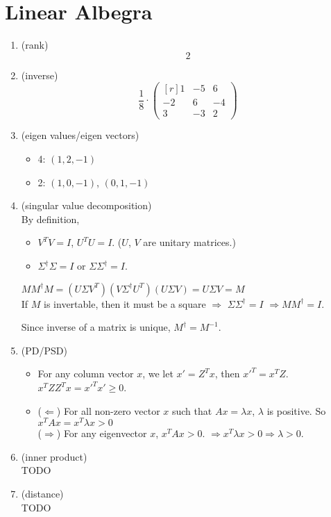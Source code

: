 \section{Linear Albegra}
\begin{enumerate}[(1)]
	\item (rank) \\
		\[ 2 \]
	\item (inverse) \\
		\[
			\frac{1}{8} \cdot
			\begin{pmatrix*}[r]
				1 & -5 & 6 \\
				-2 & 6 & -4 \\
				3 & -3 & 2
			\end{pmatrix*}
		\]
	\item (eigen values/eigen vectors)
		\begin{itemize}
			\item 4: $(1, 2, -1)$
			\item 2: $(1, 0, -1)$, $(0, 1, -1)$
		\end{itemize}
	\item (singular value decomposition) \\
		By definition,
		\begin{itemize}
			\item $V^T V=I$, $U^T U=I$. ($U$, $V$ are unitary matrices.)
			\item $\Sigma^{\dagger}\Sigma=I$ or $\Sigma\Sigma^{\dagger}=I$.
		\end{itemize}
		$MM^{\dagger}M = (U\Sigma V^T)(V\Sigma^{\dagger}U^T)(U\Sigma V) = U\Sigma V = M$ \\
		If $M$ is invertable, then it must be a square $\Rightarrow$ $\Sigma\Sigma^{\dagger}=I$ $\Rightarrow MM^{\dagger}=I$.

		Since inverse of a matrix is unique, $M^{\dagger}=M^{-1}$.
	\item (PD/PSD)
		\begin{itemize}
			\item For any column vector $x$, we let $x' = Z^Tx$,
				then $x'^T = x^TZ$.$x^TZZ^Tx = x'^Tx' \geq 0$.
			\item ($\Leftarrow$) For all non-zero vector $x$ such that
				$Ax = \lambda x$, $\lambda$ is positive.  So
				$x^TAx = x^T\lambda x > 0$ \\
				($\Rightarrow$) For any eigenvector $x$, $x^TAx > 0$.
				$\Rightarrow x^T\lambda x > 0 \Rightarrow \lambda > 0$.
		\end{itemize}
	\item (inner product) \\
		TODO
	\item (distance) \\
		TODO
\end{enumerate}
